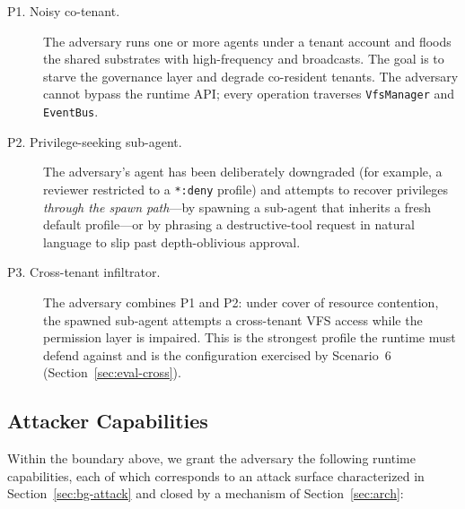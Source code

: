 \begin{description}
    \item[P1. Noisy co-tenant.] The adversary runs one or more agents
    under a tenant account and floods the shared substrates with
    high-frequency \IO{} and broadcasts. The goal is to starve the
    governance layer and degrade co-resident tenants. The adversary
cannot bypass the runtime API; every operation traverses
\texttt{VfsManager} and \texttt{EventBus}.

    \item[P2. Privilege-seeking sub-agent.] The adversary's agent has
    been deliberately downgraded (for example, a reviewer restricted to
    a \texttt{*:deny} profile) and attempts to recover privileges
    \emph{through the spawn path}---by spawning a sub-agent that
    inherits a fresh default profile---or by phrasing a destructive-tool
    request in natural language to slip past depth-oblivious approval.

    \item[P3. Cross-tenant infiltrator.] The adversary combines P1 and
    P2: under cover of resource contention, the spawned sub-agent
    attempts a cross-tenant VFS access while the permission layer is
impaired. This is the strongest profile the runtime must defend
against and is the configuration exercised by Scenario~6
    (Section~\ref{sec:eval-cross}).
\end{description}

\subsection{Attacker Capabilities}
\label{sec:threat-cap}

Within the boundary above, we grant the adversary the following
runtime capabilities, each of which corresponds to an attack surface
characterized in Section~\ref{sec:bg-attack} and closed by a mechanism
of Section~\ref{sec:arch}:

